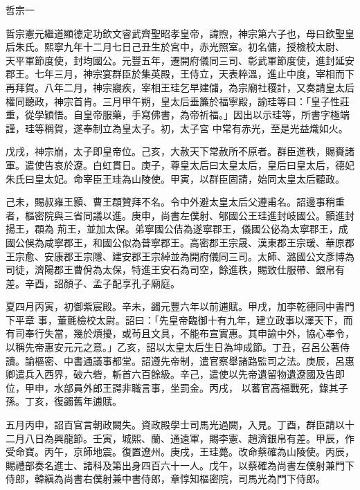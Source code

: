 
\begin{pinyinscope}

 哲宗一



 哲宗憲元繼道顯德定功欽文睿武齊聖昭孝皇帝，諱煦，神宗第六子也，母曰欽聖皇后朱氏。熙寧九年十二月七日己丑生於宮中，赤光照室。初名傭，授檢校太尉、
 天平軍節度使，封均國公。元豐五年，遷開府儀同三司、彰武軍節度使，進封延安郡王。七年三月，神宗宴群臣於集英殿，王侍立，天表粹溫，進止中度，宰相而下再拜賀。八年二月，神宗寢疾，宰相王珪乞早建儲，為宗廟社稷計，又奏請皇太后權同聽政，神宗首肯。三月甲午朔，皇太后垂簾於福寧殿，諭珪等曰：「皇子性莊重，從學穎悟。自皇帝服藥，手寫佛書，為帝祈福。」因出以示珪等，所書字極端謹，珪等稱賀，遂奉制立為皇太子。初，太子宮
 中常有赤光，至是光益熾如火。



 戊戌，神宗崩，太子即皇帝位。己亥，大赦天下常赦所不原者。群臣進秩，賜賚諸軍。遣使告哀於遼。白虹貫日。庚子，尊皇太后曰太皇太后，皇后曰皇太后，德妃朱氏曰皇太妃。命宰臣王珪為山陵使。甲寅，以群臣固請，始同太皇太后聽政。



 己未，賜叔雍王顥、曹王頵贊拜不名。令中外避太皇太后父遵甫名。詔邊事稍重者，樞密院與三省同議以進。庚申，尚書左僕射、郇國公王珪進封岐國公。顥進封揚王，頵為
 荊王，並加太保。弟寧國公佶為遂寧郡王，儀國公佖為太寧郡王，成國公俁為咸寧郡王，和國公似為普寧郡王。高密郡王宗晟、漢東郡王宗瑗、華原郡王宗愈、安康郡王宗隱、建安郡王宗綽並為開府儀同三司。太師、潞國公文彥博為司徒，濟陽郡王曹佾為太保，特進王安石為司空，餘進秩，賜致仕服帶、銀帛有差。辛酉，詔顏子、孟子配享孔子廟庭。



 夏四月丙寅，初御紫宸殿。辛未，蠲元豐六年以前逋賦。甲戌，加李乾德同中書門下平章
 事，董氈檢校太尉。詔曰：「先皇帝臨御十有九年，建立政事以澤天下，而有司奉行失當，幾於煩擾，或茍且文具，不能布宣實惠。其申諭中外，協心奉令，以稱先帝惠安元元之意。」乙亥，詔以太皇太后生日為坤成節。丁丑，召呂公著侍讀。諭樞密、中書通議事都堂。詔遵先帝制，遣官察舉諸路監司之法。庚辰，呂惠卿遣兵入西界，破六砦，斬首六百餘級。辛己，遣使以先帝遺留物遺遼國及告即位，甲申，水部員外郎王諤非職言事，坐罰金。丙戌，
 以蕃官高福戰死，錄其子孫。丁亥，復蠲舊年逋賦。



 五月丙申，詔百官言朝政闕失。資政殿學士司馬光過闕，入見。丁酉，群臣請以十二月八日為興龍節。壬寅，城熙、蘭、通遠軍，賜李憲、趙濟銀帛有差。甲辰，作受命寶。丙午，京師地震。復置遼州。庚戌，王珪薨。改命蔡確為山陵使。丙辰，賜禮部奏名進士、諸科及第出身四百六十一人。戊午，以蔡確為尚書左僕射兼門下侍郎，韓縝為尚書右僕射兼中書侍郎，章惇知樞密院，司馬光為門下侍郎。




\end{pinyinscope}

